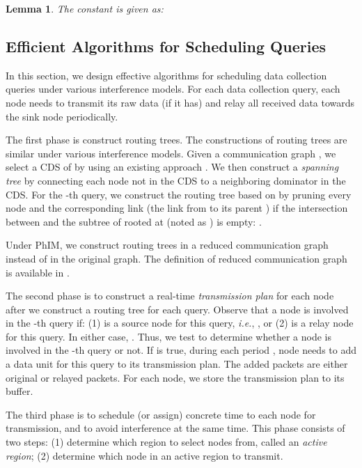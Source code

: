 \documentclass[conference,10pt]{IEEEtran}\usepackage{amsmath}
\newtheorem{lemma}{{Lemma}}
\def\ie{\textit{i.e.}\xspace}
\begin{document}
\begin{lemma}
\label{lem:c_1_pro}
The constant  is given as:

\end{lemma}


\subsection{Efficient Algorithms for Scheduling Queries}\label{sec:col_alg}
In this section, we design effective algorithms for scheduling data
collection queries under various interference models.
For each data collection query, each node needs to transmit its raw data (if it has) and relay all
received data towards the sink node periodically.



The first phase is construct routing trees.
The constructions of routing trees
 are similar under various interference models.
Given a communication graph , we select
 a CDS  of  by using an existing approach
 \cite{wan2002infocom}.
We then construct a \emph{spanning tree}  by connecting
 each node not in the CDS to a neighboring dominator in the CDS.
For the -th query, we construct the routing tree  based on  by
 pruning every node  and the corresponding link
  (the link from  to its parent )
 if the intersection between  and the subtree of  rooted
 at  (noted as ) is empty: .

Under PhIM,
 we construct routing trees
 in a reduced communication graph instead
of in the original graph.
The definition of reduced communication graph is available in \cite{xu2012TMC}.

The second phase is to construct a real-time \emph{transmission
 plan} for each node after we construct a routing tree for each query.
Observe that a node  is involved in the -th query
 if: (1)  is a source node for this query, \ie, ,
 or (2)  is a relay node for this query.
In either case,  .
Thus, we test  to determine
 whether a node  is involved in the -th query or not.
If  is true, during each period
,
 node  needs to add a data unit for this query to its transmission plan.
The added packets are either original  or
 relayed packets.
For each node, we store the transmission plan to its buffer.

The third phase is to schedule (or assign) concrete time to each
node
 for transmission,
 and to avoid interference at the same time.
This phase consists of two steps: (1) determine which
region to select nodes from, called an \emph{active region}; (2)
determine which node in an active region to transmit.
\end{document}
